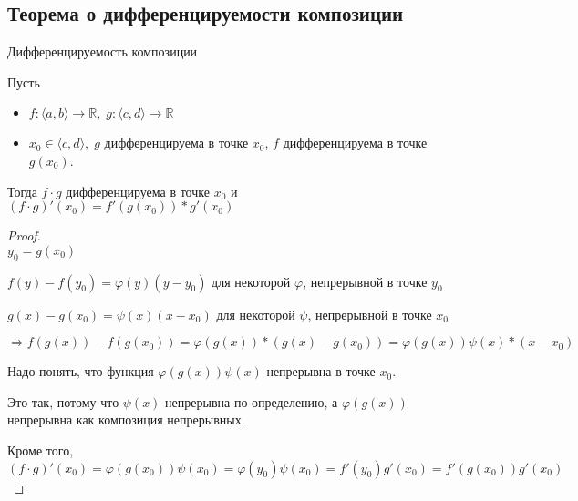 \subsection{Теорема о дифференцируемости композиции \href{https://youtu.be/OXDjegAsmSU?t=2865}{\Walley}}
\begin{theorem-non} 
    Дифференцируемость композиции

    Пусть 
    \begin{itemize}
        \item $f: \langle a, b \rangle \to \mathbb{R}, \; g: \langle c, d \rangle \to \mathbb{R}$
        \item $x_0 \in \langle c, d \rangle, \; g$ дифференцируема в точке $x_0$, $f$ дифференцируема в точке $g(x_0)$.
    \end{itemize}

    Тогда $f \cdot g$ дифференцируема в точке $x_0$ и $(f \cdot g)'(x_0) = f'(g(x_0)) * g'(x_0)$
\end{theorem-non}
\begin{proof} \quad \\
    $y_0 = g(x_0)$

    $f(y) - f(y_0) = \varphi(y)(y - y_0)$ для некоторой $\varphi$, непрерывной в точке $y_0$

    $g(x) - g(x_0) = \psi(x)(x - x_0)$ для некоторой $\psi$, непрерывной в точке $x_0$

    $\Rightarrow f(g(x)) - f(g(x_0)) = \varphi(g(x)) * (g(x) - g(x_0)) = \varphi(g(x))\psi(x) * (x - x_0)$

    Надо понять, что функция $\varphi(g(x))\psi(x)$ непрерывна в точке $x_0$.

    Это так, потому что $\psi(x)$ непрерывна по определению, а $\varphi(g(x))$ непрерывна как композиция непрерывных.

    Кроме того, $(f \cdot g)'(x_0) = \varphi(g(x_0))\psi(x_0) = \varphi(y_0)\psi(x_0) = f'(y_0)g'(x_0) = f'(g(x_0))g'(x_0)$
\end{proof}